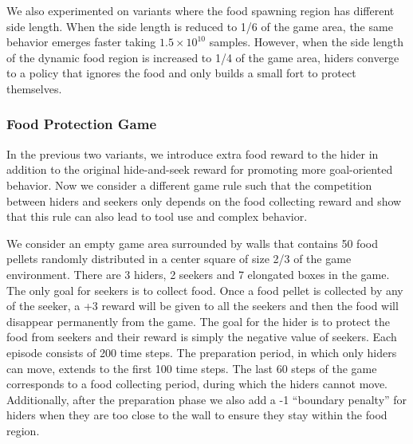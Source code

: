 We also experimented on variants where the food spawning region has different side length. When the side length is reduced to 1/6 of the game area, the same behavior emerges faster taking $1.5\times 10^{10}$ samples. However, when the side length of the dynamic food region is increased to 1/4 of the game area, hiders converge to a policy that ignores the food and only builds a small fort to protect themselves.

\subsubsection{Food Protection Game}
\label{appendix:food_protection}
In the previous two variants, we introduce extra food reward to the hider in addition to the original hide-and-seek reward for promoting more goal-oriented behavior. Now we consider a different game rule such that the competition between hiders and seekers only depends on the food collecting reward and show that this rule can also lead to tool use and complex behavior.

We consider an empty game area surrounded by walls that contains 50 food pellets randomly distributed in a center square of size 2/3 of the game environment.  There are 3 hiders, 2 seekers and 7 elongated boxes in the game. The only goal for seekers is to collect food. Once a food pellet is collected by any of the seeker, a +3 reward will be given to all the seekers and then the food will disappear permanently from the game. The goal for the hider is to protect the food from seekers and their reward is simply the negative value of seekers. Each episode consists of 200 time steps. The preparation period, in which only hiders can move, extends to the first 100 time steps. The last 60 steps of the game corresponds to a food collecting period, during which the hiders cannot move. Additionally, after the preparation phase we also add a -1 ``boundary penalty'' for hiders when they are too close to the wall to ensure they stay within the food region.

